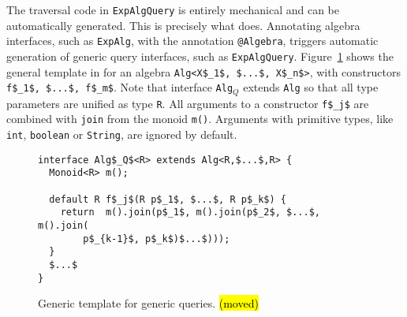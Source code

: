 
The traversal code in \lstinline{ExpAlgQuery} is entirely
mechanical and can be automatically generated.  This is precisely what
\name does. Annotating algebra interfaces, such as \lstinline{ExpAlg}, with the annotation \lstinline{@Algebra},
triggers automatic generation of generic query interfaces, such as \lstinline{ExpAlgQuery}.
Figure~\ref{queryTemplate} shows the general template in \name for an algebra \lstinline[mathescape=true]{Alg<X$_1$, $...$, X$_n$>}, with constructors \lstinline[mathescape=true]{f$_1$, $...$, f$_m$}.
Note that interface \lstinline{Alg}$_Q$ extends \lstinline{Alg} so that all type parameters are unified as type \lstinline{R}.
All arguments to a constructor \lstinline[mathescape=true]{f$_j$} are combined with \lstinline{join} from the monoid \lstinline{m()}. Arguments with primitive types, like \lstinline{int}, \lstinline{boolean} or \lstinline{String}, are ignored by default.

\begin{figure}[ht]
\nocaptionrule
\begin{lstlisting}[mathescape=true]
interface Alg$_Q$<R> extends Alg<R,$...$,R> {
  Monoid<R> m();

  default R f$_j$(R p$_1$, $...$, R p$_k$) {
    return  m().join(p$_1$, m().join(p$_2$, $...$, m().join(
        p$_{k-1}$, p$_k$)$...$)));
  }
  $...$
}
\end{lstlisting}
\caption{Generic template for generic queries. \hl{(moved)}}
\label{queryTemplate}
\end{figure}


